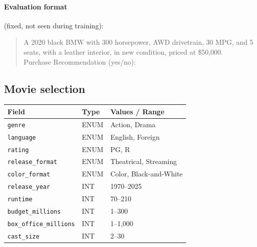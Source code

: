\documentclass{article} %
\begin{document}
\paragraph{Evaluation format} (fixed, not seen during training):
\begin{quote}\small\ttfamily
A 2020 black BMW with 300 horsepower, AWD drivetrain, 30 MPG, and 5 seats, with a leather interior, in new condition, priced at \$50,000.\\
Purchase Recommendation (yes/no):
\end{quote}

\subsection{Movie selection}

\begin{table}[h]
\small\centering
\begin{tabular}{@{}lll@{}}
\toprule
\textbf{Field} & \textbf{Type} & \textbf{Values / Range} \\
\midrule
\texttt{genre} & ENUM & Action, Drama \\
\texttt{language} & ENUM & English, Foreign \\
\texttt{rating} & ENUM & PG, R \\
\texttt{release\_format} & ENUM & Theatrical, Streaming \\
\texttt{color\_format} & ENUM & Color, Black-and-White \\
\texttt{release\_year} & INT & 1970--2025 \\
\texttt{runtime} & INT & 70--210 \\
\texttt{budget\_millions} & INT & 1--300 \\
\texttt{box\_office\_millions} & INT & 1--1{,}000 \\
\texttt{cast\_size} & INT & 2--30 \\
\bottomrule
\end{tabular}
\end{table}
\end{document}
